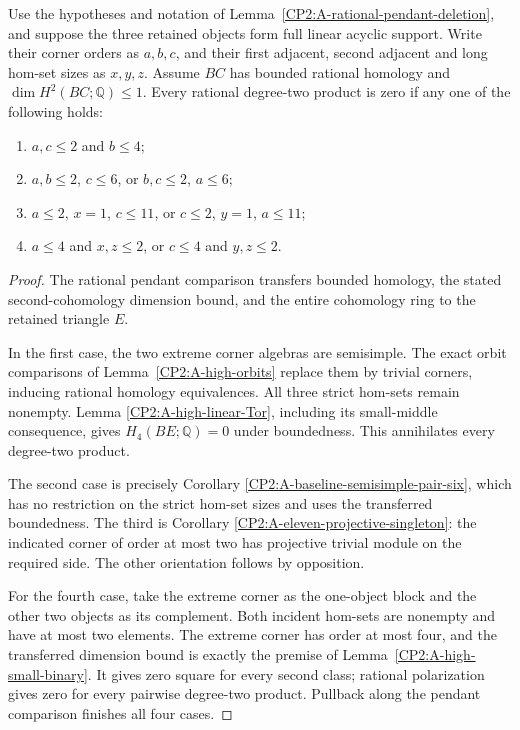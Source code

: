 \begin{corollary}
\label{CP2:A-pendant-bounded-triangle-gates}
Use the hypotheses and notation of
Lemma~\ref{CP2:A-rational-pendant-deletion}, and suppose the
three retained objects form full linear acyclic support.
Write their corner orders as $a,b,c$, and their first
adjacent, second adjacent and long hom-set sizes as $x,y,z$.
Assume $BC$ has bounded rational homology and
$\dim H^2(BC;\mathbb Q)\leq1$. Every rational degree-two
product is zero if any one of the following holds:
\begin{enumerate}
\item $a,c\leq2$ and $b\leq4$;
\item $a,b\leq2$, $c\leq6$, or $b,c\leq2$, $a\leq6$;
\item $a\leq2$, $x=1$, $c\leq11$, or
      $c\leq2$, $y=1$, $a\leq11$;
\item $a\leq4$ and $x,z\leq2$, or
      $c\leq4$ and $y,z\leq2$.
\end{enumerate}
\end{corollary}
\begin{proof}
The rational pendant comparison transfers bounded homology,
the stated second-cohomology dimension bound, and the entire
cohomology ring to the retained triangle $E$.

In the first case, the two extreme corner algebras are
semisimple. The exact orbit comparisons of
Lemma~\ref{CP2:A-high-orbits} replace them by trivial
corners, inducing rational homology equivalences. All
three strict hom-sets remain nonempty. Lemma
\ref{CP2:A-high-linear-Tor}, including its small-middle
consequence, gives $H_4(BE;\mathbb Q)=0$ under boundedness.
This annihilates every degree-two product.

The second case is precisely Corollary
\ref{CP2:A-baseline-semisimple-pair-six}, which has no
restriction on the strict hom-set sizes and uses the
transferred boundedness. The third is Corollary
\ref{CP2:A-eleven-projective-singleton}: the indicated
corner of order at most two has projective trivial module
on the required side. The other orientation follows by
opposition.

For the fourth case, take the extreme corner as the
one-object block and the other two objects as its
complement. Both incident hom-sets are nonempty and
have at most two elements. The extreme corner has order
at most four, and the transferred dimension bound is
exactly the premise of Lemma~\ref{CP2:A-high-small-binary}.
It gives zero square for every second class; rational
polarization gives zero for every pairwise degree-two
product. Pullback along the pendant comparison finishes
all four cases.
\end{proof}
